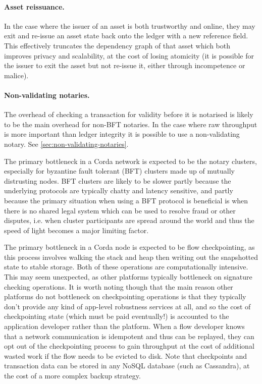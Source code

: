 \documentclass{article}
\begin{document}
\paragraph{Asset reissuance.}In the case where the issuer of an asset is both trustworthy and online, they may
exit and re-issue an asset state back onto the ledger with a new reference field. This effectively truncates the
dependency graph of that asset which both improves privacy and scalability, at the cost of losing atomicity (it
is possible for the issuer to exit the asset but not re-issue it, either through incompetence or malice).

\paragraph{Non-validating notaries.}The overhead of checking a transaction for validity before it is notarised is
likely to be the main overhead for non-BFT notaries. In the case where raw throughput is more important than
ledger integrity it is possible to use a non-validating notary. See \cref{sec:non-validating-notaries}.

The primary bottleneck in a Corda network is expected to be the notary clusters, especially for byzantine fault
tolerant (BFT) clusters made up of mutually distrusting nodes. BFT clusters are likely to be slower partly because the
underlying protocols are typically chatty and latency sensitive, and partly because the primary situation when
using a BFT protocol is beneficial is when there is no shared legal system which can be used to resolve fraud or
other disputes, i.e. when cluster participants are spread around the world and thus the speed of light becomes
a major limiting factor.

The primary bottleneck in a Corda node is expected to be flow checkpointing, as this process involves walking the
stack and heap then writing out the snapshotted state to stable storage. Both of these operations are computationally
intensive. This may seem unexpected, as other platforms typically bottleneck on signature
checking operations. It is worth noting though that the main reason other platforms do not bottleneck
on checkpointing operations is that they typically don't provide any kind of app-level robustness services
at all, and so the cost of checkpointing state (which must be paid eventually!) is accounted to the application
developer rather than the platform. When a flow developer knows that a network communication is idempotent and
thus can be replayed, they can opt out of the checkpointing process to gain throughput at the cost of additional
wasted work if the flow needs to be evicted to disk. Note that checkpoints and transaction data can be stored in
any NoSQL database (such as Cassandra), at the cost of a more complex backup strategy.
\end{document}
